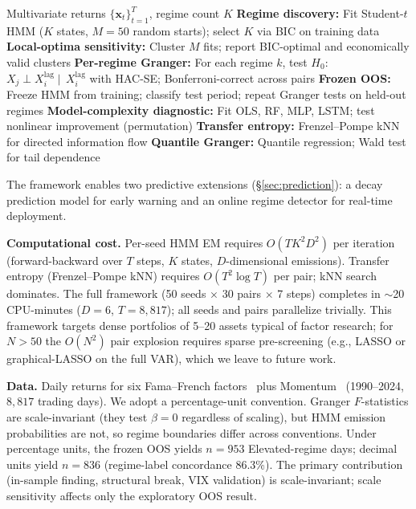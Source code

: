 \documentclass[sigconf,anonymous]{acmart}
\begin{document}
\begin{algorithm}[t]
\caption{Regime-Conditional Granger Framework}
\label{alg:protocol}
\begin{algorithmic}[1]
\REQUIRE Multivariate returns $\{\mathbf{x}_t\}_{t=1}^T$, regime count $K$
\STATE \textbf{Regime discovery:} Fit Student-$t$ HMM ($K$ states, $M = 50$ random starts); select $K$ via BIC on training data
\STATE \textbf{Local-optima sensitivity:} Cluster $M$ fits; report BIC-optimal and economically valid clusters
\STATE \textbf{Per-regime Granger:} For each regime $k$, test $H_0$: $X_j \perp X_i^{\text{lag}} \mid\, X_i^{\text{lag}}$ with HAC-SE; Bonferroni-correct across pairs
\STATE \textbf{Frozen OOS:} Freeze HMM from training; classify test period; repeat Granger tests on held-out regimes
\STATE \textbf{Model-complexity diagnostic:} Fit OLS, RF, MLP, LSTM; test nonlinear improvement (permutation)
\STATE \textbf{Transfer entropy:} Frenzel--Pompe kNN for directed information flow
\STATE \textbf{Quantile Granger:} Quantile regression; Wald test for tail dependence
\end{algorithmic}
\end{algorithm}

The framework enables two predictive extensions (\S\ref{sec:prediction}):
a decay prediction model for early warning and an online regime detector
for real-time deployment.

\textbf{Computational cost.} Per-seed HMM EM requires $O(TK^2D^2)$ per
iteration (forward-backward over $T$ steps, $K$ states, $D$-dimensional
emissions). Transfer entropy (Frenzel--Pompe kNN) requires $O(T^2 \log T)$
per pair; kNN search dominates. The full framework (50 seeds
$\times$ 30 pairs $\times$ 7 steps) completes in ${\sim}$20 CPU-minutes
($D = 6$, $T = 8{,}817$); all seeds and pairs parallelize trivially.
This framework targets dense portfolios of 5--20 assets typical of
factor research; for $N > 50$ the $O(N^2)$ pair explosion requires
sparse pre-screening (e.g., LASSO or graphical-LASSO on the full
VAR), which we leave to future work.

\textbf{Data.} Daily returns for six Fama--French factors~\cite{fama2015five}
plus Momentum~\cite{carhart1997persistence} (1990--2024, $8{,}817$ trading days).
We adopt a percentage-unit convention. Granger $F$-statistics are scale-invariant
(they test $\beta = 0$ regardless of scaling), but HMM emission
probabilities are not, so regime boundaries differ across conventions.
Under percentage units, the frozen OOS yields $n = 953$ Elevated-regime
days; decimal units yield $n = 836$ (regime-label concordance 86.3\%). The primary
contribution (in-sample finding, structural break, VIX validation) is
scale-invariant; scale sensitivity affects only the exploratory OOS result.
\end{document}
